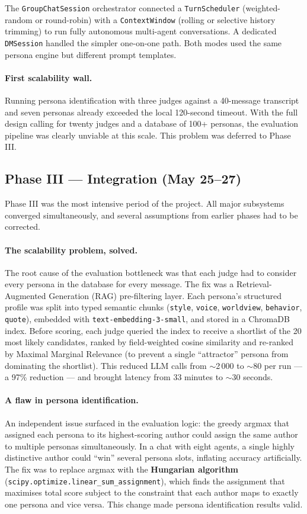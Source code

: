 \documentclass[12pt,a4paper]{article}
\begin{document}
The \texttt{GroupChatSession} orchestrator connected a \texttt{TurnScheduler} (weighted-random
or round-robin) with a \texttt{ContextWindow} (rolling or selective history trimming) to run
fully autonomous multi-agent conversations. A dedicated \texttt{DMSession} handled the simpler
one-on-one path. Both modes used the same persona engine but different prompt templates.

\paragraph{First scalability wall.}
Running persona identification with three judges against a 40-message transcript and seven
personas already exceeded the local 120-second timeout. With the full design calling for twenty
judges and a database of 100+ personas, the evaluation pipeline was clearly unviable at this
scale. This problem was deferred to Phase III.

\subsection{Phase III --- Integration (May 25--27)}

Phase III was the most intensive period of the project. All major subsystems converged
simultaneously, and several assumptions from earlier phases had to be corrected.
\paragraph{The scalability problem, solved.}
The root cause of the evaluation bottleneck was that each judge had to consider every persona
in the database for every message. The fix was a Retrieval-Augmented Generation (RAG)
pre-filtering layer. Each persona's structured profile was split into typed semantic chunks
(\texttt{style}, \texttt{voice}, \texttt{worldview}, \texttt{behavior}, \texttt{quote}),
embedded with \texttt{text-embedding-3-small}, and stored in a ChromaDB index. Before scoring,
each judge queried the index to receive a shortlist of the 20 most likely candidates, ranked by
field-weighted cosine similarity and re-ranked by Maximal Marginal Relevance (to prevent a
single ``attractor'' persona from dominating the shortlist). This reduced LLM calls from
$\sim$2\,000 to $\sim$80 per run --- a 97\% reduction --- and brought latency from 33 minutes
to $\sim$30 seconds.

\paragraph{A flaw in persona identification.}
An independent issue surfaced in the evaluation logic: the greedy argmax that assigned each
persona to its highest-scoring author could assign the same author to multiple personas
simultaneously. In a chat with eight agents, a single highly distinctive author could ``win''
several persona slots, inflating accuracy artificially. The fix was to replace argmax with the
\textbf{Hungarian algorithm} (\texttt{scipy.optimize.linear\_sum\_assignment}), which
finds the assignment that maximises total score subject to the constraint that each author maps
to exactly one persona and vice versa. This change made persona identification results valid.
\end{document}
